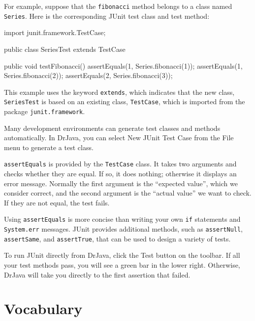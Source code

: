 \documentclass[12pt]{book}
\theoremstyle{exercise}
\newcommand{\java}[1]{\verb"#1"}
\begin{document}
For example, suppose that the \java{fibonacci} method belongs to a class named \java{Series}.
Here is the corresponding JUnit test class and test method:

\begin{code}
import junit.framework.TestCase;

public class SeriesTest extends TestCase {

    public void testFibonacci() {
        assertEquals(1, Series.fibonacci(1));
        assertEquals(1, Series.fibonacci(2));
        assertEquals(2, Series.fibonacci(3));
    }
}
\end{code}

This example uses the keyword \java{extends}, which indicates that the new class, \java{SeriesTest} is based on an existing class, \java{TestCase}, which is imported from the package \java{junit.framework}.

Many development environments can generate test classes and methods automatically.
In DrJava, you can select {\sf New JUnit Test Case} from the {\sf File} menu to generate a test class.

\java{assertEquals} is provided by the \java{TestCase} class.
It takes two arguments and checks whether they are equal.
If so, it does nothing; otherwise it displays an error message.
Normally the first argument is the ``expected value'', which we consider correct, and the second argument is the ``actual value'' we want to check.
If they are not equal, the test fails.

Using \java{assertEquals} is more concise than writing your own \java{if} statements and \java{System.err} messages.
JUnit provides additional methods, such as \java{assertNull}, \java{assertSame}, and \java{assertTrue}, that can be used to design a variety of tests.

To run JUnit directly from DrJava, click the {\sf Test} button on the toolbar.
If all your test methods pass, you will see a green bar in the lower right.
Otherwise, DrJava will take you directly to the first assertion that failed.


\section{Vocabulary}
\end{document}
